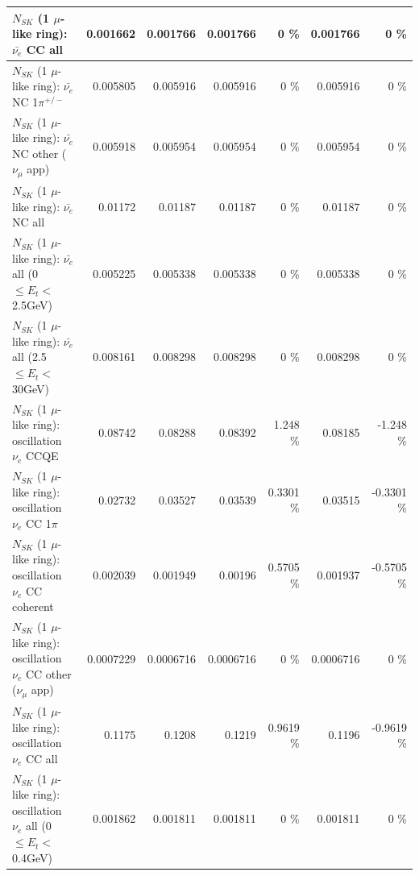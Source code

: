 \begin{table}
\begin{tabular}{| l | r | r | r  r | r  r |}
                            $N_{SK}$ (1 $\mu$-like ring): $\bar{\nu_{e}}$ CC all &        0.001662 &        0.001766 &        0.001766 &        0 \%  &        0.001766 &        0 \%  \\ 
\hline
                     $N_{SK}$ (1 $\mu$-like ring): $\bar{\nu_e}$ NC 1$\pi^{+/-}$ &        0.005805 &        0.005916 &        0.005916 &        0 \%  &        0.005916 &        0 \%  \\ 
            $N_{SK}$ (1 $\mu$-like ring): $\bar{\nu_e}$ NC other ($\nu_\mu$ app) &        0.005918 &        0.005954 &        0.005954 &        0 \%  &        0.005954 &        0 \%  \\ 
                            $N_{SK}$ (1 $\mu$-like ring): $\bar{\nu_{e}}$ NC all &         0.01172 &         0.01187 &         0.01187 &        0 \%  &         0.01187 &        0 \%  \\ 
\hline
     $N_{SK}$ (1 $\mu$-like ring): $\bar{\nu_{e}}$ all (0 $\leq E_{t} <$ 2.5GeV) &        0.005225 &        0.005338 &        0.005338 &        0 \%  &        0.005338 &        0 \%  \\ 
    $N_{SK}$ (1 $\mu$-like ring): $\bar{\nu_{e}}$ all (2.5 $\leq E_{t} <$ 30GeV) &        0.008161 &        0.008298 &        0.008298 &        0 \%  &        0.008298 &        0 \%  \\ 
\hline
\hline
\hline
                          $N_{SK}$ (1 $\mu$-like ring): oscillation $\nu_e$ CCQE &         0.08742 &         0.08288 &         0.08392 &    1.248 \%  &         0.08185 &   -1.248 \%  \\ 
                     $N_{SK}$ (1 $\mu$-like ring): oscillation $\nu_e$ CC 1$\pi$ &         0.02732 &         0.03527 &         0.03539 &   0.3301 \%  &         0.03515 &  -0.3301 \%  \\ 
                   $N_{SK}$ (1 $\mu$-like ring): oscillation $\nu_e$ CC coherent &        0.002039 &        0.001949 &         0.00196 &   0.5705 \%  &        0.001937 &  -0.5705 \%  \\ 
      $N_{SK}$ (1 $\mu$-like ring): oscillation $\nu_e$ CC other ($\nu_\mu$ app) &       0.0007229 &       0.0006716 &       0.0006716 &        0 \%  &       0.0006716 &        0 \%  \\ 
                       $N_{SK}$ (1 $\mu$-like ring): oscillation $\nu_e$  CC all &          0.1175 &          0.1208 &          0.1219 &   0.9619 \%  &          0.1196 &  -0.9619 \%  \\ 
\hline
$N_{SK}$ (1 $\mu$-like ring): oscillation $\nu_{e}$ all (0 $\leq E_{t} <$ 0.4GeV) &        0.001862 &        0.001811 &        0.001811 &        0 \%  &        0.001811 &        0 \%  \\ 

\end{tabular}
\end{table}
